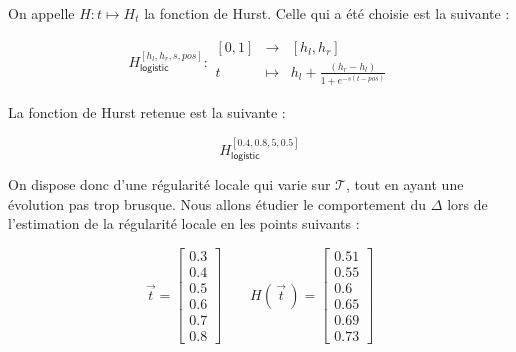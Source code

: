 \begin{minipage}{0.47\linewidth}
	On appelle $H : t \mapsto H_t$ la fonction de Hurst. Celle qui a été choisie est la suivante :

	\begin{equation*}
		H^{[h_l, h_r, s, pos]}_{\textsf{logistic}} : \begin{array}{ccc}
			[0,1] & \longrightarrow & [h_l, h_r]
			\\
			t     & \longmapsto     & h_l + \frac{(h_r - h_l)}{1 + e^{-s(t - pos)}}
		\end{array}
	\end{equation*}

	La fonction de Hurst retenue est la suivante :

	\begin{equation*}
		H^{[0.4, 0.8, 5, 0.5]}_{\textsf{logistic}}
	\end{equation*}

	On dispose donc d'une régularité locale qui varie sur $\mathcal T$, tout en ayant une évolution pas trop brusque. Nous allons étudier le comportement du $\Delta$ lors de l'estimation de la régularité locale en les points suivants :

	\begin{equation*}
		\vec t = \begin{bmatrix} 0.3 \\ 0.4 \\ 0.5 \\ 0.6 \\ 0.7 \\ 0.8 \end{bmatrix}
		\quad\quad
		H(\, \vec t \,) =
		\begin{bmatrix}
			0.51 \\ 0.55 \\ 0.6 \\ 0.65 \\ 0.69 \\ 0.73
		\end{bmatrix}
	\end{equation*}

\end{minipage}
\hfill
